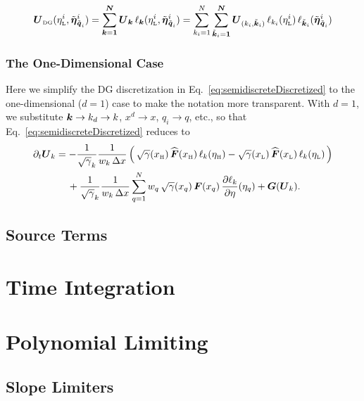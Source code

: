 \documentclass[10pt,preprint]{aastex}
\begin{document}
\begin{equation}
  \boldsymbol{U}_{\mbox{\tiny DG}}(\eta_{\mbox{\tiny L}}^{i},\tilde{\boldsymbol{\eta}}_{\tilde{\boldsymbol{q}}_{i}}^{i})
  =\sum_{\boldsymbol{k}=\boldsymbol{1}}^{\boldsymbol{N}}\boldsymbol{U}_{\boldsymbol{k}}\,\ell_{\boldsymbol{k}}(\eta_{\mbox{\tiny L}}^{i},\tilde{\boldsymbol{\eta}}_{\tilde{\boldsymbol{q}}_{i}}^{i})
  =\sum_{k_{i}=1}^{N}\sum_{\tilde{\boldsymbol{k}}_{i}=\boldsymbol{1}}^{\boldsymbol{N}}\boldsymbol{U}_{(k_{i},\tilde{\boldsymbol{k}}_{i})}\,\ell_{k_{i}}(\eta_{\mbox{\tiny L}}^{i})\,\ell_{\tilde{\boldsymbol{k}}_{i}}(\tilde{\boldsymbol{\eta}}_{\tilde{\boldsymbol{q}}_{i}}^{i})
\end{equation}

\subsubsection{The One-Dimensional Case}

Here we simplify the DG discretization in Eq.~\eqref{eq:semidiscreteDiscretized} to the one-dimensional ($d=1$) case to make the notation more transparent.  
With $d=1$, we substitute $\boldsymbol{k}\to k_{d}\to k$, $x^{d}\to x$, $q_{i}\to q$, etc., so that Eq.~\eqref{eq:semidiscreteDiscretized} reduces to
\begin{align}
  \partial_{t}{}\boldsymbol{U}_{k}
  &=-\frac{1}{\sqrt{\gamma}_{k}}
  \frac{1}{w_{k}\,\Delta x}\,
  \Big(\,
    \sqrt{\gamma}(x_{\mbox{\tiny H}})\,\widehat{\boldsymbol{F}}(x_{\mbox{\tiny H}})\,\ell_{k}(\eta_{\mbox{\tiny H}})
    -\sqrt{\gamma}(x_{\mbox{\tiny L}})\,\widehat{\boldsymbol{F}}(x_{\mbox{\tiny L}})\,\ell_{k}(\eta_{\mbox{\tiny L}})
  \,\Big) \nonumber \\
  & \hspace{12pt}
  +\frac{1}{\sqrt{\gamma}_{k}}
  \frac{1}{w_{k}\,\Delta x}\sum_{q=1}^{N}w_{q}\,\sqrt{\gamma}(x_{q})\,\boldsymbol{F}(x_{q})\,\frac{\partial \ell_{k}}{\partial \eta}(\eta_{q})
  +\boldsymbol{G}(\boldsymbol{U}_{k}).
  \label{eq:semidiscreteDiscretized1D}
\end{align}

\subsection{Source Terms}
\label{sec:sourceTerms}

\section{Time Integration}

\section{Polynomial Limiting}

\subsection{Slope Limiters}
\end{document}
